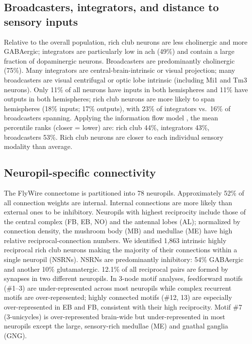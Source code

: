 \documentclass[11pt]{article}
\begin{document}
\subsection{Broadcasters, integrators, and distance to sensory inputs}
Relative to the overall population, rich club neurons are less cholinergic and more GABAergic; integrators are particularly low in ach (49\%) and contain a large fraction of dopaminergic neurons. Broadcasters are predominantly cholinergic (75\%). Many integrators are central-brain-intrinsic or visual projection; many broadcasters are visual centrifugal or optic lobe intrinsic (including Mi1 and Tm3 neurons). Only 11\% of all neurons have inputs in both hemispheres and 11\% have outputs in both hemispheres; rich club neurons are more likely to span hemispheres (18\% inputs; 17\% outputs), with 23\% of integrators vs.\ 16\% of broadcasters spanning. Applying the information flow model \cite{dorkenwald2023neuronal,schlegel2021information}, the mean percentile ranks (closer = lower) are: rich club 44\%, integrators 43\%, broadcasters 53\%. Rich club neurons are closer to each individual sensory modality than average.

\subsection{Neuropil-specific connectivity}
The FlyWire connectome is partitioned into 78 neuropils. Approximately 52\% of all connection weights are internal. Internal connections are more likely than external ones to be inhibitory. Neuropils with highest reciprocity include those of the central complex (FB, EB, NO) and the antennal lobes (AL); normalized by connection density, the mushroom body (MB) and medullae (ME) have high relative reciprocal-connection numbers. We identified 1{,}863 intrinsic highly reciprocal rich club neurons making the majority of their connections within a single neuropil (NSRNs). NSRNs are predominantly inhibitory: 54\% GABAergic and another 10\% glutamatergic. 12.1\% of all reciprocal pairs are formed by synapses in two different neuropils. In 3-node motif analyses, feedforward motifs (\#1--3) are under-represented across most neuropils while complex recurrent motifs are over-represented; highly connected motifs (\#12, 13) are especially over-represented in EB and FB, consistent with their high reciprocity. Motif \#7 (3-unicycles) is over-represented brain-wide but under-represented in most neuropils except the large, sensory-rich medullae (ME) and gnathal ganglia (GNG).
\end{document}

